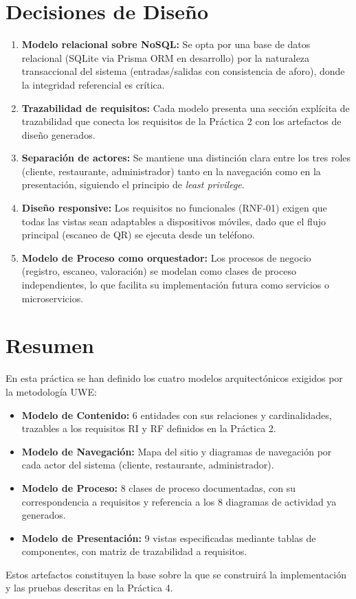 \section{Decisiones de Diseño}

\begin{enumerate}
    \item \textbf{Modelo relacional sobre NoSQL:} Se opta por una base de datos relacional (SQLite via Prisma ORM en desarrollo) por la naturaleza transaccional del sistema (entradas/salidas con consistencia de aforo), donde la integridad referencial es crítica.

    \item \textbf{Trazabilidad de requisitos:} Cada modelo presenta una sección explícita de trazabilidad que conecta los requisitos de la Práctica 2 con los artefactos de diseño generados.

    \item \textbf{Separación de actores:} Se mantiene una distinción clara entre los tres roles (cliente, restaurante, administrador) tanto en la navegación como en la presentación, siguiendo el principio de \textit{least privilege}.

    \item \textbf{Diseño responsive:} Los requisitos no funcionales (RNF-01) exigen que todas las vistas sean adaptables a dispositivos móviles, dado que el flujo principal (escaneo de QR) se ejecuta desde un teléfono.

    \item \textbf{Modelo de Proceso como orquestador:} Los procesos de negocio (registro, escaneo, valoración) se modelan como clases de proceso independientes, lo que facilita su implementación futura como servicios o microservicios.
\end{enumerate}

\section{Resumen}

En esta práctica se han definido los cuatro modelos arquitectónicos exigidos por la metodología UWE:

\begin{itemize}
    \item \textbf{Modelo de Contenido:} 6 entidades con sus relaciones y cardinalidades, trazables a los requisitos RI y RF definidos en la Práctica 2.
    \item \textbf{Modelo de Navegación:} Mapa del sitio y diagramas de navegación por cada actor del sistema (cliente, restaurante, administrador).
    \item \textbf{Modelo de Proceso:} 8 clases de proceso documentadas, con su correspondencia a requisitos y referencia a los 8 diagramas de actividad ya generados.
    \item \textbf{Modelo de Presentación:} 9 vistas especificadas mediante tablas de componentes, con matriz de trazabilidad a requisitos.
\end{itemize}

Estos artefactos constituyen la base sobre la que se construirá la implementación y las pruebas descritas en la Práctica 4.